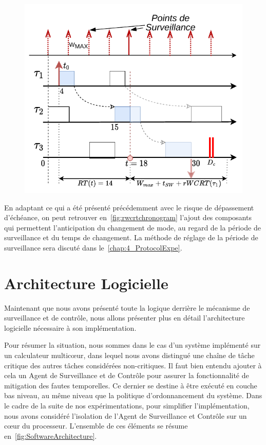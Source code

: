 \documentclass[french, a4paper, 11pt, twoside, pdftex]{StyleThese}
\begin{document}
    \begin{figure}[ht]
    	\centering
    	\includegraphics[width=0.7\linewidth]{schemas/chronogram_rWCRT_complet}
    	\caption{}
    	\label{fig:rwcrtchronogram}
    \end{figure}

    En adaptant ce qui a été présenté précédemment avec le risque de dépassement d'échéance, on peut retrouver en~\autoref{fig:rwcrtchronogram} l'ajout des composants qui permettent l'anticipation du changement de mode, au regard de la période de surveillance et du temps de changement.
	La méthode de réglage de la période de surveillance sera discuté dans le~\autoref{chap:4_ProtocolExpe}.
	
	\section{Architecture Logicielle}
	
	Maintenant que nous avons présenté toute la logique derrière le mécanisme de surveillance et de contrôle, nous allons présenter plus en détail l'architecture logicielle nécessaire à son implémentation.
	
	Pour résumer la situation, nous sommes dans le cas d'un système implémenté sur un calculateur multicœur, dans lequel nous avons distingué une chaîne de tâche critique des autres tâches considérées non-critiques. Il faut bien entendu ajouter à cela un Agent de Surveillance et de Contrôle pour assurer la fonctionnalité de mitigation des fautes temporelles. Ce dernier se destine à être exécuté en couche bas niveau, au même niveau que la politique d'ordonnancement du système. Dans le cadre de la suite de nos expérimentations, pour simplifier l'implémentation, nous avons considéré l'isolation de l'Agent de Surveillance et Contrôle sur un cœur du processeur. L'ensemble de ces éléments se résume en~\autoref{fig:SoftwareArchitecture}.
\end{document}
